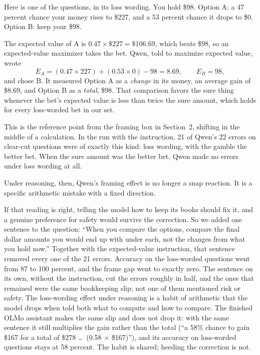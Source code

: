 \documentclass[11pt]{article}
\begin{document}
\begin{workbox}
Here is one of the questions, in its loss wording. You hold \$98. Option A: a 47 percent chance your
money rises to \$227, and a 53 percent chance it drops to \$0. Option B: keep your \$98.

The expected value of A is $0.47 \times \$227 = \$106.69$, which beats \$98, so an expected-value
maximizer takes the bet. Qwen, told to maximize expected value, wrote
\[
E_A = (0.47 \times 227) + (0.53 \times 0) - 98 = 8.69, \qquad E_B = 98,
\]
and chose B. It measured Option A as a \emph{change} in its money, an average gain of \$8.69, and
Option B as a \emph{total}, \$98. That comparison favors the sure thing whenever the bet's expected
value is less than twice the sure amount, which holds for every loss-worded bet in our set.

This is the reference point from the framing box in Section~2, shifting in the middle of a
calculation. In the run with the instruction, 21 of Qwen's 22 errors on clear-cut questions were of
exactly this kind: loss wording, with the gamble the better bet. When the sure amount was the better
bet, Qwen made no errors under loss wording at all.
\end{workbox}

Under reasoning, then, Qwen's framing effect is no longer a snap reaction. It is a specific
arithmetic mistake with a fixed direction.

If that reading is right, telling the model how to keep its books should fix it, and a genuine
preference for safety would survive the correction. So we added one sentence to the question:
``When you compare the options, compare the final dollar amounts you would end up with under each, not
the changes from what you hold now.'' Together with the expected-value instruction, that sentence
removed every one of the 21 errors. Accuracy on the loss-worded questions went from 87 to 100 percent,
and the frame gap went to exactly zero. The sentence on its own, without the instruction, cut the
errors roughly in half, and the ones that remained were the same bookkeeping slip; not one of them
mentioned risk or safety. The loss-wording effect under reasoning is a habit of arithmetic that the
model drops when told both what to compute and how to compare. The finished OLMo assistant makes the
same slip and does not drop it: with the same sentence it still multiplies the gain rather than the
total (``a 58\% chance to gain \$167 for a total of \$278 \ldots\ (0.58 $\times$ \$167)''), and its
accuracy on loss-worded questions stays at 58 percent. The habit is shared; heeding the correction is
not.
\end{document}

